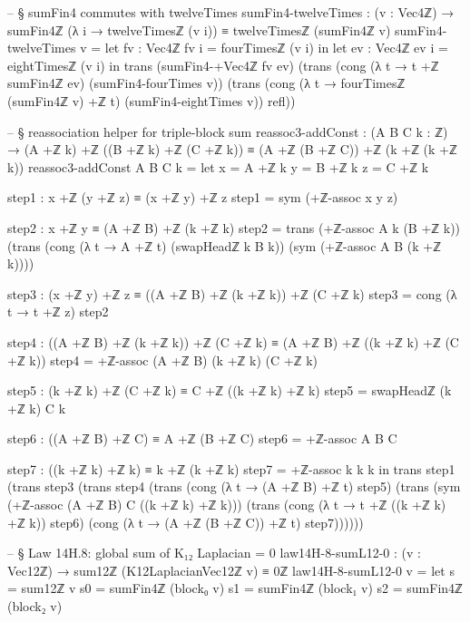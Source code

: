 \documentclass[11pt,a4paper]{book}
\begin{document}
\begin{code}
  -- § sumFin4 commutes with twelveTimes
  sumFin4-twelveTimes : (v : Vec4ℤ) →
    sumFin4ℤ (λ i → twelveTimesℤ (v i)) ≡ twelveTimesℤ (sumFin4ℤ v)
  sumFin4-twelveTimes v =
    let fv : Vec4ℤ
        fv i = fourTimesℤ (v i)
    in
    let ev : Vec4ℤ
        ev i = eightTimesℤ (v i)
    in
    trans
      (sumFin4-+Vec4ℤ fv ev)
      (trans
        (cong (λ t → t +ℤ sumFin4ℤ ev) (sumFin4-fourTimes v))
        (trans
          (cong (λ t → fourTimesℤ (sumFin4ℤ v) +ℤ t) (sumFin4-eightTimes v))
          refl))

  -- § reassociation helper for triple-block sum
  reassoc3-addConst : (A B C k : ℤ) →
    (A +ℤ k) +ℤ ((B +ℤ k) +ℤ (C +ℤ k)) ≡ (A +ℤ (B +ℤ C)) +ℤ (k +ℤ (k +ℤ k))
  reassoc3-addConst A B C k =
    let
      x = A +ℤ k
      y = B +ℤ k
      z = C +ℤ k

      step1 : x +ℤ (y +ℤ z) ≡ (x +ℤ y) +ℤ z
      step1 = sym (+ℤ-assoc x y z)

      step2 : x +ℤ y ≡ (A +ℤ B) +ℤ (k +ℤ k)
      step2 =
        trans
          (+ℤ-assoc A k (B +ℤ k))
          (trans
            (cong (λ t → A +ℤ t) (swapHeadℤ k B k))
            (sym (+ℤ-assoc A B (k +ℤ k))))

      step3 : (x +ℤ y) +ℤ z ≡ ((A +ℤ B) +ℤ (k +ℤ k)) +ℤ (C +ℤ k)
      step3 = cong (λ t → t +ℤ z) step2

      step4 : ((A +ℤ B) +ℤ (k +ℤ k)) +ℤ (C +ℤ k) ≡ (A +ℤ B) +ℤ ((k +ℤ k) +ℤ (C +ℤ k))
      step4 = +ℤ-assoc (A +ℤ B) (k +ℤ k) (C +ℤ k)

      step5 : (k +ℤ k) +ℤ (C +ℤ k) ≡ C +ℤ ((k +ℤ k) +ℤ k)
      step5 = swapHeadℤ (k +ℤ k) C k

      step6 : ((A +ℤ B) +ℤ C) ≡ A +ℤ (B +ℤ C)
      step6 = +ℤ-assoc A B C

      step7 : ((k +ℤ k) +ℤ k) ≡ k +ℤ (k +ℤ k)
      step7 = +ℤ-assoc k k k
    in
      trans
        step1
        (trans
          step3
          (trans
            step4
            (trans
              (cong (λ t → (A +ℤ B) +ℤ t) step5)
              (trans
                (sym (+ℤ-assoc (A +ℤ B) C ((k +ℤ k) +ℤ k)))
                (trans
                  (cong (λ t → t +ℤ ((k +ℤ k) +ℤ k)) step6)
                  (cong (λ t → (A +ℤ (B +ℤ C)) +ℤ t) step7))))))

  -- § Law 14H.8: global sum of K₁₂ Laplacian = 0
  law14H-8-sumL12-0 : (v : Vec12ℤ) → sum12ℤ (K12LaplacianVec12ℤ v) ≡ 0ℤ
  law14H-8-sumL12-0 v =
    let
      s  = sum12ℤ v
      s0 = sumFin4ℤ (block₀ v)
      s1 = sumFin4ℤ (block₁ v)
      s2 = sumFin4ℤ (block₂ v)


\end{code}
\end{document}
